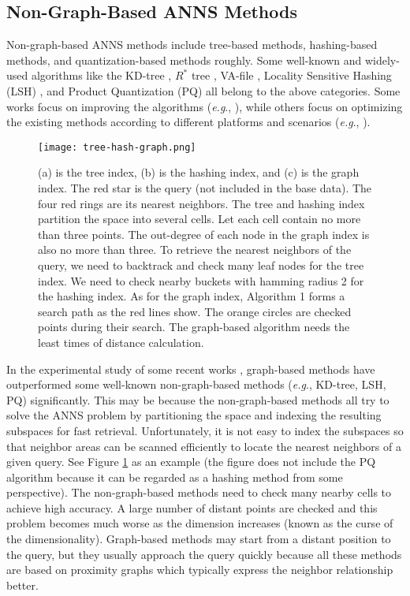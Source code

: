 \documentclass{vldb}
\def\eg {\emph{e.g}.} \def\Eg{\emph{E.g}.}
\begin{document}
\subsection{Non-Graph-Based ANNS Methods}
Non-graph-based ANNS methods include tree-based methods, hashing-based methods, and quantization-based methods roughly. Some well-known and widely-used algorithms like the KD-tree \cite{Silpaanan2008Optimised}, $R^*$ tree \cite{beckmann1990r}, VA-file \cite{weber1998quantitative}, Locality Sensitive Hashing (LSH) \cite{Gionis1999Similarity}, and Product Quantization (PQ) \cite{jegou2011product} all belong to the above categories. Some works focus on improving the algorithms (\eg , \cite{HuangFZFN15, AroraSK018, gao2014dsh, liu2014sk, ge2013optimized}), while others focus on optimizing the existing methods according to different platforms and scenarios (\eg , \cite{chen2005robust, de2002efficient, teodoro2014approximate, zheng2016lazylsh}). 

\begin{figure}[t]
\begin{center}
\texttt{[image: tree-hash-graph.png]}
\end{center}
   \caption{(a) is the tree index, (b) is the hashing index, and (c) is the graph index. The red star is the query (not included in the base data). The four red rings are its nearest neighbors. The tree and hashing index partition the space into several cells. Let each cell contain no more than three points. The out-degree of each node in the graph index is also no more than three. To retrieve the nearest neighbors of the query, we need to backtrack and check many leaf nodes for the tree index. We need to check nearby buckets with hamming radius 2 for the hashing index. As for the graph index, Algorithm 1 forms a search path as the red lines show. The orange circles are checked points during their search. The graph-based algorithm needs the least times of distance calculation.}
\label{tree-hash-graph}
\end{figure}

In the experimental study of some recent works \cite{Jin2014Fast, malkov2014approximate, MalkovYHNSW16, Ben2016Fanng, AroraSK018, CongEfanna2016}, graph-based methods have outperformed some well-known non-graph-based methods (\eg , KD-tree, LSH, PQ) significantly. This may be because the non-graph-based methods all try to solve the ANNS problem by partitioning the space and indexing the resulting subspaces for fast retrieval. Unfortunately, it is not easy to index the subspaces so that neighbor areas can be scanned efficiently to locate the nearest neighbors of a given query. See Figure \ref{tree-hash-graph} as an example (the figure does not include the PQ algorithm because it can be regarded as a hashing method from some perspective).  The non-graph-based methods need to check many nearby cells to achieve high accuracy. A large number of distant points are checked and this problem becomes much worse as the dimension increases (known as the curse of the dimensionality). Graph-based methods may start from a distant position to the query, but they usually approach the query quickly because all these methods are based on proximity graphs which typically express the neighbor relationship better. 
\end{document}
